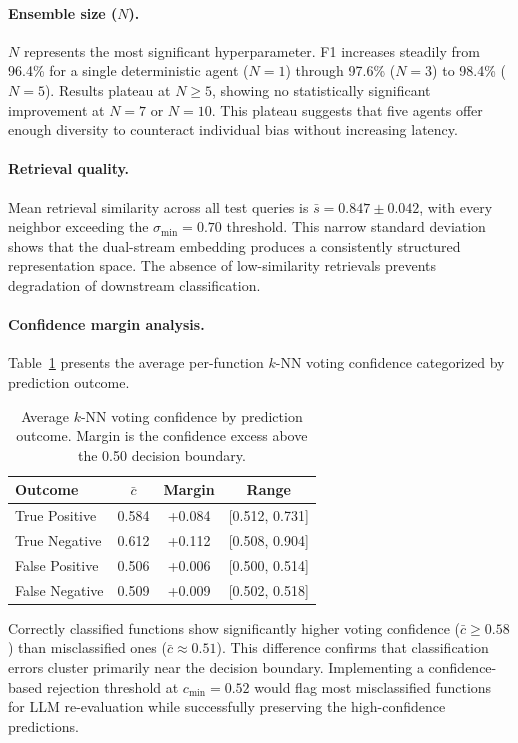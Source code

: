 \documentclass[pdflatex,sn-mathphys-num]{sn-jnl}
\begin{document}
\paragraph{Ensemble size ($N$).}
$N$ represents the most significant hyperparameter. F1 increases steadily from 96.4\% for a single deterministic agent ($N{=}1$) through 97.6\% ($N{=}3$) to 98.4\% ($N{=}5$). Results plateau at $N \geq 5$, showing no statistically significant improvement at $N{=}7$ or $N{=}10$. This plateau suggests that five agents offer enough diversity to counteract individual bias without increasing latency.

\paragraph{Retrieval quality.}
Mean retrieval similarity across all test queries is $\bar{s} = 0.847 \pm 0.042$, with every neighbor exceeding the $\sigma_{\min}{=}0.70$ threshold. This narrow standard deviation shows that the dual-stream embedding produces a consistently structured representation space. The absence of low-similarity retrievals prevents degradation of downstream classification.

\paragraph{Confidence margin analysis.}
Table~\ref{tab:confidence} presents the average per-function $k$-NN voting confidence categorized by prediction outcome.

\begin{table}[t]
\centering
\caption{Average $k$-NN voting confidence by prediction outcome.
Margin is the confidence excess above the 0.50 decision boundary.}
\label{tab:confidence}
\small
\begin{tabular}{@{}lccc@{}}
\toprule
\textbf{Outcome} & $\bar{c}$ & \textbf{Margin} & \textbf{Range} \\
\midrule
True Positive & 0.584 & +0.084 & [0.512, 0.731] \\
True Negative & 0.612 & +0.112 & [0.508, 0.904] \\
False Positive & 0.506 & +0.006 & [0.500, 0.514] \\
False Negative & 0.509 & +0.009 & [0.502, 0.518] \\
\bottomrule
\end{tabular}
\end{table}

Correctly classified functions show significantly higher voting confidence ($\bar{c} \geq 0.58$) than misclassified ones ($\bar{c} \approx 0.51$). This difference confirms that classification errors cluster primarily near the decision boundary. Implementing a confidence-based rejection threshold at $c_{\min} = 0.52$ would flag most misclassified functions for LLM re-evaluation while successfully preserving the high-confidence predictions.
\end{document}
